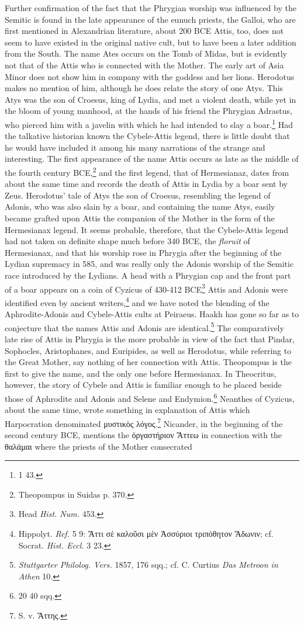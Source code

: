 \documentclass[a4paper, 11pt, oneside, polutonikogreek, english]{article}
\begin{document}
Further confirmation of the fact that the Phrygian worship was influenced by the Semitic is found in the late appearance of the eunuch priests, the Galloi, who are first mentioned in Alexandrian literature, about 200 \textsc{BCE} Attis, too, does not seem to have existed in the original native cult, but to have been a later addition from the South. The name Ates occurs on the Tomb of Midas, but is evidently not that of the Attis who is connected with the Mother. The early art of Asia Minor does not show him in company with the goddess and her lions. Herodotus makes no mention of him, although he does relate the story of one Atys. This Atys was the son of Croesus, king of Lydia, and met a violent death, while yet in the bloom of young manhood, at the hands of his friend the Phrygian Adrastus, who pierced him with a javelin with which he had intended to slay a boar.\footnote{1 43.} Had the talkative historian known the Cybele-Attis legend, there is little doubt that he would have included it among his many narrations of the strange and interesting. The first appearance of the name Attis occurs as late as the middle of the fourth century \textsc{BCE},\footnote{Theopompus in Suidas p. 370.} and the first legend, that of Hermesianaz, dates from about the same time and records the death of Attis in Lydia by a boar sent by Zeus. Herodotus' tale of Atys the son of Croesus, resembling the legend of Adonis, who was also slain by a boar, and containing the name Atys, easily became grafted upon Attis the companion of the Mother in the form of the Hermesianax legend. It seems probable, therefore, that the Cybele-Attis legend had not taken on definite shape much before 340 \textsc{BCE}, the \emph{floruit} of Hermesianax, and that his worship rose in Phrygia after the beginning of the Lydian supremacy in 585, and was really only the Adonis worship of the Semitic race introduced by the Lydians. A head with a Phrygian cap and the front part of a boar appears on a coin of Cyzicus of 430-412 \textsc{BCE}\footnote{Head \emph{Hist. Num.} 453.} Attis and Adonis were identified even by ancient writers,\footnote{Hippolyt. \emph{Ref.} 5 9: Ἄττι σὲ καλοῦσι μὲν Ἀσσύριοι τριπόθητον Ἄδωνιν; cf. Socrat. \emph{Hist. Eccl.} 3 23.} and we have noted the blending of the Aphrodite-Adonis and Cybele-Attis cults at Peiraeus. Haakh has gone so far as to conjecture that the names Attis and Adonis are identical.\footnote{\emph{Stuttgarter Philolog. Vers.} 1857, 176 sqq.; cf. C. Curtius \emph{Das Metroon in Athen} 10.} The comparatively late rise of Attis in Phrygia is the more probable in view of the fact that Pindar, Sophocles, Aristophanes, and Euripides, as well as Herodotus, while referring to the Great Mother, say nothing of her connection with Attis. Theopompus is the first to give the name, and the only one before Hermesianax. In Theocritus, however, the story of Cybele and Attis is familiar enough to be placed beside those of Aphrodite and Adonis and Selene and Endymion.\footnote{20 40 sqq.} Neanthes of Cyzicus, about the same time, wrote something in explanation of Attis which Harpocration denominated μυστικὸς λόγος.\footnote{S. v. Ἄττης.} Nicander, in the beginning of the second century \textsc{BCE}, mentions the ὀργαστήριον Ἄττεω in connection with the θαλάμαι where the priests of the Mother consecrated 
\end{document}
